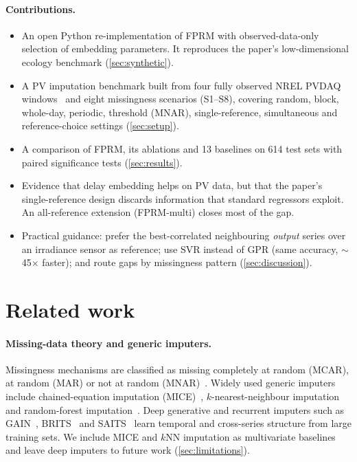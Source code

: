 \documentclass[11pt,a4paper]{article}
\begin{document}
\paragraph{Contributions.}
\begin{itemize}
  \item An open Python re-implementation of FPRM with observed-data-only selection of embedding parameters. It reproduces the paper's low-dimensional ecology benchmark (\cref{sec:synthetic}).
  \item A PV imputation benchmark built from four fully observed NREL PVDAQ windows~\cite{pvdaq} and eight missingness scenarios (S1--S8), covering random, block, whole-day, periodic, threshold (MNAR), single-reference, simultaneous and reference-choice settings (\cref{sec:setup}).
  \item A comparison of FPRM, its ablations and 13 baselines on 614 test sets with paired significance tests (\cref{sec:results}).
  \item Evidence that delay embedding helps on PV data, but that the paper's single-reference design discards information that standard regressors exploit. An all-reference extension (FPRM-multi) closes most of the gap.
  \item Practical guidance: prefer the best-correlated neighbouring \emph{output} series over an irradiance sensor as reference; use SVR instead of GPR (same accuracy, $\sim$45$\times$ faster); and route gaps by missingness pattern (\cref{sec:discussion}).
\end{itemize}

\section{Related work}\label{sec:related}

\paragraph{Missing-data theory and generic imputers.}
Missingness mechanisms are classified as missing completely at random (MCAR), at random (MAR) or not at random (MNAR)~\cite{rubin1976,little2019}.
Widely used generic imputers include chained-equation imputation (MICE)~\cite{vanbuuren2011}, $k$-nearest-neighbour imputation~\cite{troyanskaya2001} and random-forest imputation~\cite{breiman2001,stekhoven2012}.
Deep generative and recurrent imputers such as GAIN~\cite{yoon2018gain}, BRITS~\cite{cao2018brits} and SAITS~\cite{du2023saits} learn temporal and cross-series structure from large training sets.
We include MICE and $k$NN imputation as multivariate baselines and leave deep imputers to future work (\cref{sec:limitations}).
\end{document}
